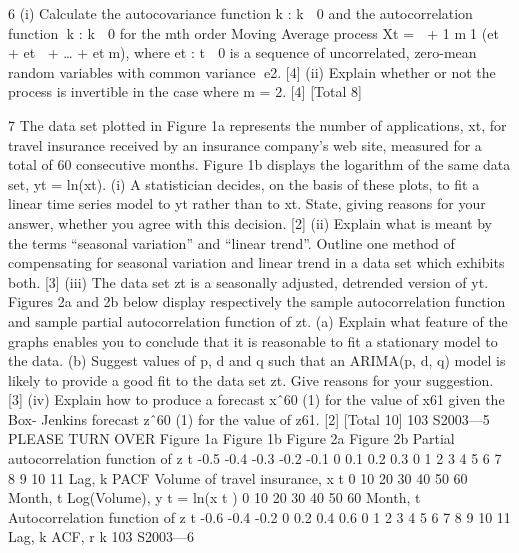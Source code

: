 \documentclass[a4paper,12pt]{article}
\begin{document}
\begin{enumerate}
6 (i) Calculate the autocovariance function {
k : k  0} and the autocorrelation
function {k : k  0} for the mth order Moving Average process
Xt =  + 1
m1
(et + et + … + etm),
where {et : t  0} is a sequence of uncorrelated, zero-mean random variables
with common variance e2. [4]
(ii) Explain whether or not the process is invertible in the case where m = 2. [4]
[Total 8]

7 The data set plotted in Figure 1a represents the number of applications, xt, for travel
insurance received by an insurance company’s web site, measured for a total of 60
consecutive months. Figure 1b displays the logarithm of the same data set, yt = ln(xt).
(i) A statistician decides, on the basis of these plots, to fit a linear time series
model to yt rather than to xt. State, giving reasons for your answer, whether
you agree with this decision. [2]
(ii) Explain what is meant by the terms “seasonal variation” and “linear trend”.
Outline one method of compensating for seasonal variation and linear trend in
a data set which exhibits both. [3]
(iii) The data set zt is a seasonally adjusted, detrended version of yt. Figures 2a and
2b below display respectively the sample autocorrelation function and sample
partial autocorrelation function of zt.
(a) Explain what feature of the graphs enables you to conclude that it is
reasonable to fit a stationary model to the data.
(b) Suggest values of p, d and q such that an ARIMA(p, d, q) model is
likely to provide a good fit to the data set zt. Give reasons for your
suggestion. [3]
(iv) Explain how to produce a forecast xˆ60 (1) for the value of x61 given the Box-
Jenkins forecast zˆ60 (1) for the value of z61. [2]
[Total 10]
103 S2003—5 PLEASE TURN OVER
Figure 1a Figure 1b
Figure 2a
Figure 2b
Partial autocorrelation function of z t
-0.5
-0.4
-0.3
-0.2
-0.1
0
0.1
0.2
0.3
0 1 2 3 4 5 6 7 8 9 10 11
Lag, k
PACF
Volume of travel insurance, x t
0 10 20 30 40 50 60
Month, t
Log(Volume), y t = ln(x t )
0 10 20 30 40 50 60
Month, t
Autocorrelation function of z t
-0.6
-0.4
-0.2
0
0.2
0.4
0.6
0 1 2 3 4 5 6 7 8 9 10 11
Lag, k
ACF, r k
103 S2003—6



\end{enumerate}
\end{document}
